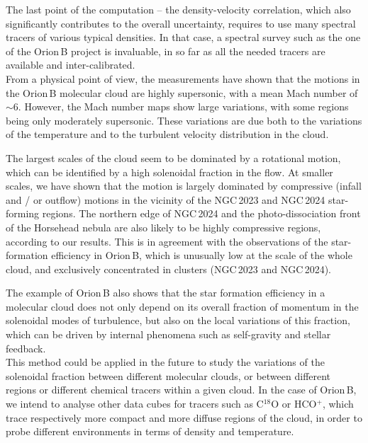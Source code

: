 \documentclass[structabstract]{aa}
\begin{document}
The last point of the computation -- the density-velocity correlation, which also significantly contributes to the overall uncertainty, requires to use many spectral tracers of various typical densities. In that case, a spectral survey such as the one of the Orion\,B project is invaluable, in so far as all the needed tracers are available and inter-calibrated.
\\

From a physical point of view, the measurements have shown that the motions in the Orion\,B molecular cloud are highly supersonic, with a mean Mach number of $\sim 6$. However, the Mach number maps show large variations, with some regions being only moderately supersonic. These variations are due both to the variations of the temperature and to the turbulent velocity distribution in the cloud.

The largest scales of the cloud seem to be dominated by a rotational motion, which can be identified by a high solenoidal fraction in the flow. At smaller scales, we have shown that the motion is largely dominated  by compressive (infall and / or outflow) motions in the vicinity of the NGC\,2023 and NGC\,2024 star-forming regions. The northern edge of NGC\,2024 and the photo-dissociation front of the Horsehead nebula are also likely to be highly compressive regions, according to our results. This is in agreement with the observations of the star-formation efficiency in Orion\,B, which is unusually low at the scale of the whole cloud, and exclusively concentrated in clusters (NGC\,2023 and NGC\,2024).

The example of Orion\,B also shows that the star formation efficiency in a molecular cloud does not only depend on its overall fraction of momentum in the solenoidal modes of turbulence, but also on the local variations of this fraction, which can be driven by internal phenomena such as self-gravity and stellar feedback.
\\

This method could be applied in the future to study the variations of the solenoidal fraction between different molecular clouds, or between different regions or different chemical tracers within a given cloud. In the case of Orion\,B, we intend to analyse other data cubes for tracers such as C$^{18}$O or HCO$^+$, which trace respectively more compact and more diffuse regions of the cloud, in order to probe different environments in terms of density and temperature.
\end{document}
